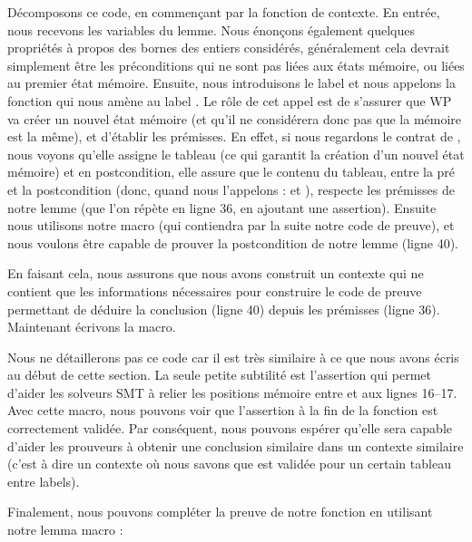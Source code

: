 Décomposons ce code, en commençant par la fonction de contexte. En entrée, nous
recevons les variables du lemme. Nous énonçons également quelques propriétés à
propos des bornes des entiers considérés, généralement cela devrait simplement
être les préconditions qui ne sont pas liées aux états mémoire, ou liées au
premier état mémoire. Ensuite, nous introduisons le label  et nous
appelons la fonction  qui nous amène au label
. Le rôle de cet appel est de s'assurer que WP va créer un nouvel
état mémoire (et qu'il ne considérera donc pas que la mémoire est la même), et
d'établir les prémisses. En effet, si nous regardons le contrat de
, nous voyons qu'elle assigne le tableau (ce qui
garantit la création d'un nouvel état mémoire) et en postcondition, elle assure
que le contenu du tableau, entre la pré et la postcondition (donc, quand nous
l'appelons :  et ), respecte les prémisses de notre
lemme (que l'on répète en ligne 36, en ajoutant une assertion). Ensuite nous
utilisons notre macro  (qui contiendra par la suite notre
code de preuve), et nous voulons être capable de prouver la postcondition de
notre lemme (ligne 40).


En faisant cela, nous assurons que nous avons construit un contexte qui ne
contient que les informations nécessaires pour construire le code de preuve
permettant de déduire la conclusion (ligne 40) depuis les prémisses (ligne 36).
Maintenant écrivons la macro.




Nous ne détaillerons pas ce code car il est très similaire à ce que nous avons
écris au début de cette section. La seule petite subtilité est l'assertion qui
permet d'aider les solveurs SMT à relier les positions mémoire entre
 et  aux lignes 16--17. Avec cette macro, nous
pouvons voir que l'assertion à la fin de la fonction 
 est correctement validée. Par
conséquent, nous pouvons espérer qu'elle sera capable d'aider les prouveurs à
obtenir une conclusion similaire dans un contexte similaire (c'est à dire un
contexte où nous savons que  est validée pour un certain
tableau entre labels).


Finalement, nous pouvons compléter la preuve de notre fonction 
en utilisant notre lemma macro :




